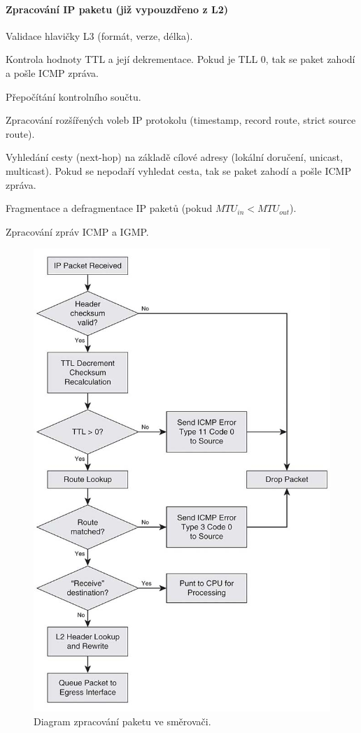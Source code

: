 \paragraph*{Zpracování IP paketu (již vypouzdřeno z L2)} \begin{compactenum}
    \item Validace hlavičky L3 (formát, verze, délka).
    \item Kontrola hodnoty TTL a její dekrementace. Pokud je TLL 0, tak se paket zahodí a pošle ICMP zpráva.
    \item Přepočítání kontrolního součtu.
    \item Zpracování rozšířených voleb IP protokolu (timestamp, record route, strict source route).
    \item Vyhledání cesty (next-hop) na základě cílové adresy (lokální doručení, unicast, multicast). Pokud se nepodaří vyhledat cesta, tak se paket zahodí a pošle ICMP zpráva.
    \item Fragmentace a defragmentace IP paketů (pokud $MTU_{in} < MTU_{out}$).
    \item Zpracování zpráv ICMP a IGMP.
\end{compactenum}

\begin{figure}[H]
    \centering
    \includegraphics[width=0.75\linewidth]{cinnost_smerovace.png}
    \caption{Diagram zpracování paketu ve směrovači.}
\end{figure}


